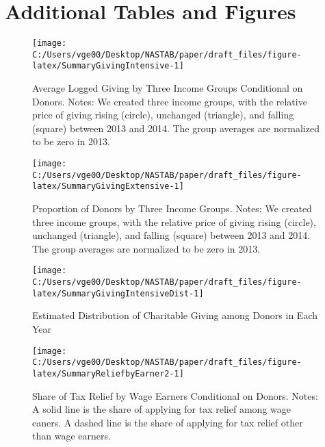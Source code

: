 \documentclass[
  11pt,
  a4paper,
]{article}
\begin{document}
\hypertarget{appendix-appendix}{%
\appendix}


\hypertarget{addtab}{%
\section{Additional Tables and Figures}\label{addtab}}

\begin{figure}[H]

{\centering \texttt{[image: C:/Users/vge00/Desktop/NASTAB/paper/draft\_files/figure-latex/SummaryGivingIntensive-1]} 

}

\caption{Average Logged Giving by Three Income Groups Conditional on Donors. Notes: We created three income groups, with the relative price of giving rising (circle), unchanged (triangle), and falling (square) between 2013 and 2014. The group averages are normalized to be zero in 2013.}\label{fig:SummaryGivingIntensive}
\end{figure}

\begin{figure}[t]

{\centering \texttt{[image: C:/Users/vge00/Desktop/NASTAB/paper/draft\_files/figure-latex/SummaryGivingExtensive-1]} 

}

\caption{Proportion of Donors by Three Income Groups. Notes: We created three income groups, with the relative price of giving rising (circle), unchanged (triangle), and falling (square) between 2013 and 2014. The group averages are normalized to be zero in 2013.}\label{fig:SummaryGivingExtensive}
\end{figure}

\begin{figure}[t]

{\centering \texttt{[image: C:/Users/vge00/Desktop/NASTAB/paper/draft\_files/figure-latex/SummaryGivingIntensiveDist-1]} 

}

\caption{Estimated Distribution of Charitable Giving among Donors in Each Year}\label{fig:SummaryGivingIntensiveDist}
\end{figure}

\begin{figure}[t]

{\centering \texttt{[image: C:/Users/vge00/Desktop/NASTAB/paper/draft\_files/figure-latex/SummaryReliefbyEarner2-1]} 

}

\caption{Share of Tax Relief by Wage Earners Conditional on Donors. Notes: A solid line is the share of applying for tax relief among wage eaners. A dashed line is the share of applying for tax relief other than wage earners.}\label{fig:SummaryReliefbyEarner2}
\end{figure}
\end{document}
